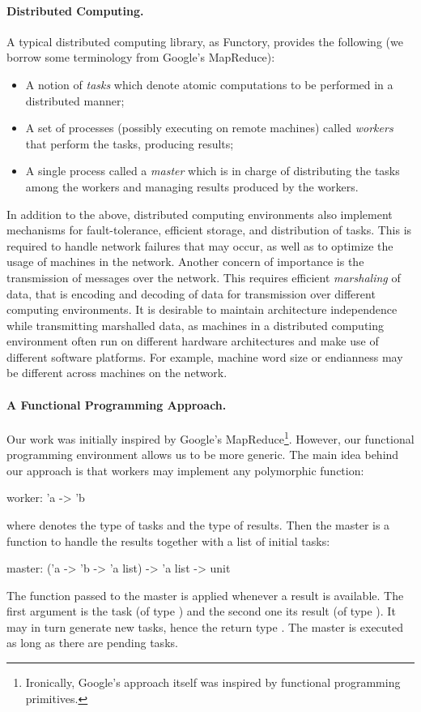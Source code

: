 \documentclass{llncs}
\newcommand{\functory}{\textsf{Functory}}
\begin{document}
\paragraph{Distributed Computing.}
A typical distributed computing library, as \functory, provides the
following (we borrow some terminology from Google's
MapReduce):
\begin{itemize}
\item A notion of \emph{tasks} which denote atomic computations
  to be performed in a distributed manner; 
\item A set of processes (possibly executing on remote machines)
  called \emph{workers} that perform
  the tasks, producing results;
\item A single process called a \emph{master} which is in charge
  of distributing the tasks among the workers and managing results
  produced by the workers.
\end{itemize}
In addition to the above, distributed computing environments also
implement mechanisms for fault-tolerance, efficient storage, and
distribution of tasks. This is required to handle network failures
that may occur, as well as to optimize the usage of machines in the
network. Another concern of importance is the transmission of messages
over the network. This requires efficient 
\emph{marshaling} of data, that is encoding and decoding of data 
for transmission over different computing environments.  It is desirable to
maintain architecture independence while transmitting marshalled data,
as machines in a distributed computing environment often run on
different hardware architectures and make use of different software
platforms. For example, machine word size or endianness may be different
across machines on the network.

\paragraph{A Functional Programming Approach.}
Our work was initially inspired by Google's
MapReduce\footnote{Ironically, Google's approach itself was inspired
  by functional programming primitives.}. However, our functional
programming environment allows us to be more generic. 
The main idea behind our approach is that
workers may implement any polymorphic function:
\begin{ocaml}
  worker: 'a -> 'b
\end{ocaml}
where  denotes the type of tasks and  the type of results.
Then the master is a
function to handle the results together with
a list of initial tasks:
\begin{ocaml}
  master: ('a -> 'b -> 'a list) -> 'a list -> unit
\end{ocaml}
The function passed to the master is applied whenever a result is
available. The first argument is the task (of type ) and the
second one its result (of type ). 
It may in turn generate new tasks, hence the return type
.  
The master is executed as long as there are pending tasks.
\end{document}
